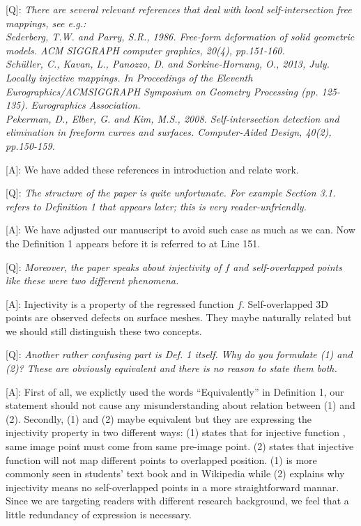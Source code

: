 \documentclass[10pt]{letter} %
\begin{document}
	[Q]: 
	\emph{There are several relevant references that deal with local self-intersection free mappings, see e.g.:\\
	Sederberg, T.W. and Parry, S.R., 1986. Free-form deformation of solid geometric models. ACM SIGGRAPH computer graphics, 20(4), pp.151-160.\\
	Schüller, C., Kavan, L., Panozzo, D. and Sorkine-Hornung, O., 2013, July. Locally injective mappings. In Proceedings of the Eleventh Eurographics/ACMSIGGRAPH Symposium on Geometry Processing (pp. 125-135). Eurographics Association.\\
	Pekerman, D., Elber, G. and Kim, M.S., 2008. Self-intersection detection and elimination in freeform curves and surfaces. Computer-Aided Design, 40(2), pp.150-159.}

	[A]: We have added these references in introduction and relate work.
	
	
	[Q]: \emph{The structure of the paper is quite unfortunate. For example Section 3.1. refers to Definition 1 that appears later; this is very reader-unfriendly.}
	
	[A]: We have adjusted our manuscript to avoid such case as much as we can. Now the Definition 1 appears before it is referred to at Line 151.
	
	[Q]: \emph{Moreover, the paper speaks about injectivity of $f$ and self-overlapped points like these were two different phenomena.}
	
	[A]: Injectivity is a property of the regressed function $f$. Self-overlapped 3D points are observed defects on surface meshes. They maybe naturally related but we should still distinguish these two concepts.
	
	[Q]: \emph{Another rather confusing part is Def. 1 itself. Why do you formulate (1) and (2)? These are obviously equivalent and there is no reason to state them both.}
	
	[A]: First of all, we explictly used the words ``Equivalently'' in Definition 1, our statement should not cause any misunderstanding about relation between (1) and (2). Secondly, (1) and (2) maybe equivalent but they are expressing the injectivity property in two different ways: (1) states that for injective function , same image point must come from same pre-image point. (2) states that injective function will not map different points to overlapped position. (1) is more commonly seen in students' text book and in Wikipedia while (2) explains why injectivity means no self-overlapped points in a more straightforward mannar. Since we are targeting readers with different research background, we feel that a little redundancy of expression is necessary.
	
\end{document}
